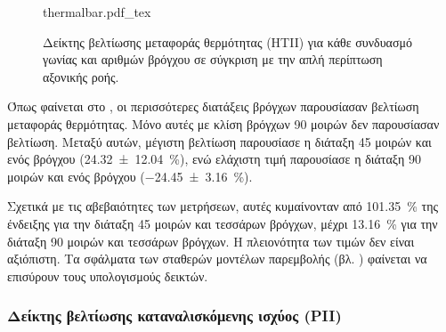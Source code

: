 \begin{figure}[!htpb]
\centering
{thermalbar.pdf_tex}
\caption{Δείκτης βελτίωσης μεταφοράς θερμότητας (HTII) για κάθε συνδυασμό γωνίας και αριθμών βρόγχου σε σύγκριση με την απλή περίπτωση αξονικής ροής.}\label{fig:thermalbar}
\end{figure}

Όπως φαίνεται στο , οι περισσότερες διατάξεις βρόγχων παρουσίασαν βελτίωση μεταφοράς θερμότητας. Μόνο αυτές με κλίση βρόγχων 90 μοιρών δεν παρουσίασαν βελτίωση. Μεταξύ αυτών, μέγιστη βελτίωση παρουσίασε η διάταξη 45 μοιρών και ενός βρόγχου (\qty[separate-uncertainty-units = single]{24.32(1204)}{\percent}), ενώ ελάχιστη τιμή παρουσίασε η διάταξη 90 μοιρών και ενός βρόγχου (\qty[separate-uncertainty-units = single]{-24.45(316)}{\percent}).

Σχετικά με τις αβεβαιότητες των μετρήσεων, αυτές κυμαίνονταν από \qty[separate-uncertainty-units = single]{101.35}{\percent} της ένδειξης για την διάταξη 45 μοιρών και τεσσάρων βρόγχων, μέχρι \qty[separate-uncertainty-units = single]{13.16}{\percent} για την διάταξη 90 μοιρών και τεσσάρων βρόγχων.  H πλειονότητα των τιμών δεν είναι αξιόπιστη. Τα σφάλματα των σταθερών μοντέλων παρεμβολής (βλ. ) φαίνεται να επισύρουν τους υπολογισμούς δεικτών.

\subsubsection{Δείκτης βελτίωσης καταναλισκόμενης ισχύος (PII)}

